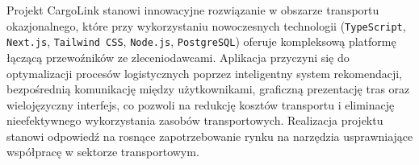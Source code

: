Projekt CargoLink stanowi innowacyjne rozwiązanie w obszarze transportu okazjonalnego, które przy wykorzystaniu nowoczesnych technologii (\texttt{TypeScript}, \texttt{Next.js}, \texttt{Tailwind CSS}, \texttt{Node.js}, \texttt{PostgreSQL}) oferuje kompleksową platformę łączącą przewoźników ze zleceniodawcami. Aplikacja przyczyni się do optymalizacji procesów logistycznych poprzez inteligentny system rekomendacji, bezpośrednią komunikację między użytkownikami, graficzną prezentację tras oraz wielojęzyczny interfejs, co pozwoli na redukcję kosztów transportu i eliminację nieefektywnego wykorzystania zasobów transportowych. Realizacja projektu stanowi odpowiedź na rosnące zapotrzebowanie rynku na narzędzia usprawniające współpracę w sektorze transportowym.